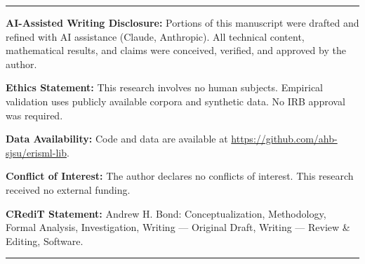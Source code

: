 \documentclass[12pt,letterpaper]{article}
\theoremstyle{definition}
\theoremstyle{plain}
\begin{document}
\begin{titlepage}
\begin{abstract}
Philosophy Engineering is the systematic discipline of translating philosophical commitments---epistemic norms, ethical principles, logical consistency requirements---into computationally enforceable constraints on autonomous systems. This document defines the field. Modeled on the IEEE/ACM Software Engineering Body of Knowledge (SWEBOK), it identifies the knowledge areas that constitute Philosophy Engineering's theoretical substrate, computational engine, and normative superstructure. The document specifies three structural tiers: (I)~the \emph{Substrate} tier, comprising the mathematical and physical formalisms---differential geometry, topology, tensor algebra, analytical mechanics, and formal semantics---that provide the representational and dynamical vocabulary; (II)~the \emph{Computation} tier, comprising algorithm design, search theory, formal verification, network theory, and AI alignment methods that translate formal structures into executable procedures; and (III)~the \emph{Values} tier, comprising metaethics, normative ethics, epistemology, philosophy of mind, and political philosophy that define the objectives, constraints, and accountability requirements of autonomous judgment. The two central technical constructs---the Epistemic Invariance Principle (EIP), which mandates that judgment procedures be invariant under meaning-preserving redescriptions, and the Bond Invariance Principle (BIP), which enforces structural accountability in normative domains by separating objective relational structures from subjective evaluative frameworks---are developed in full, with proofs. The document is intended to serve as the foundational reference for researchers, engineers, and policymakers working at the intersection of formal philosophy, mathematics, and AI system design.
\end{abstract}

\vfill

\noindent\rule{\linewidth}{0.4pt}
\small
\noindent\textbf{AI-Assisted Writing Disclosure:} Portions of this manuscript were drafted and refined with AI assistance (Claude, Anthropic). All technical content, mathematical results, and claims were conceived, verified, and approved by the author.

\noindent\textbf{Ethics Statement:} This research involves no human subjects. Empirical validation uses publicly available corpora and synthetic data. No IRB approval was required.

\noindent\textbf{Data Availability:} Code and data are available at \url{https://github.com/ahb-sjsu/erisml-lib}.

\noindent\textbf{Conflict of Interest:} The author declares no conflicts of interest. This research received no external funding.

\noindent\textbf{CRediT Statement:} Andrew H. Bond: Conceptualization, Methodology, Formal Analysis, Investigation, Writing --- Original Draft, Writing --- Review \& Editing, Software.
\noindent\rule{\linewidth}{0.4pt}
\normalsize

\end{titlepage}
\end{document}
